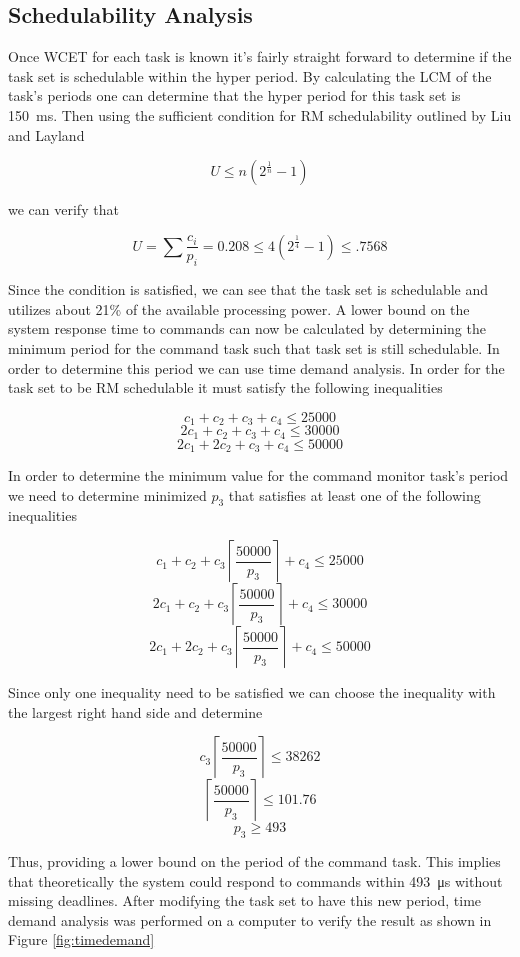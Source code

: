 \documentclass{article}
\begin{document}
\subsection{Schedulability Analysis}
 Once WCET for each task is known it's fairly straight forward to determine if the task set is schedulable within the hyper period. By calculating the LCM of the task's periods one can determine that the hyper period for this task set is \SI{150}{\milli\second}. Then using the sufficient condition for RM schedulability outlined by Liu and Layland \cite{ll} 

\[
U \leq n(2^{\frac{1}{n}}-1)
\]

we can verify that

\[ U = \sum \frac{c_{i}}{p_{i}} = 0.208 \leq 4(2^{\frac{1}{4}}-1) \leq .7568\]

Since the condition is satisfied, we can see that the task set is schedulable and utilizes about 21\% of the available processing power. A lower bound on the system response time to commands can now be calculated by determining the minimum period for the command task such that task set is still schedulable. In order to determine this period we can use time demand analysis. In order for the task set to be RM schedulable it must satisfy the following inequalities


\[c_1 + c_2 + c_3 + c_4 \leq 25000 \]
\[2c_1 + c_2 + c_3 + c_4 \leq 30000 \]
\[2c_1 + 2c_2 + c_3 + c_4 \leq 50000\]

In order to determine the minimum value for the command monitor task's period we need to determine minimized $p_{3}$ that satisfies at least one of the following inequalities

\[c_1 + c_2 + c_3\left\lceil \frac{50000}{p_3}\right\rceil + c_4 \leq 25000 \]
\[2c_1 + c_2 + c_3\left\lceil \frac{50000}{p_3}\right\rceil + c_4 \leq 30000 \]
\[2c_1 + 2c_2 + c_3\left\lceil \frac{50000}{p_3}\right\rceil + c_4 \leq 50000\]
\pagebreak


Since only one inequality need to be satisfied we can choose the inequality with the largest right hand side and determine

\[c_3\left\lceil \frac{50000}{p_3}\right\rceil \leq 38262\]
\[\left\lceil \frac{50000}{p_3}\right\rceil \leq 101.76\]
\[p_3 \geq 493 \]

Thus, providing a lower bound on the period of the command task. This implies that theoretically the system could respond to commands within \SI{493}{\micro\second} without missing deadlines. After modifying the task set to have this new period, time demand analysis was performed on a computer to verify the result as shown in Figure \ref{fig:timedemand} 
\end{document}
